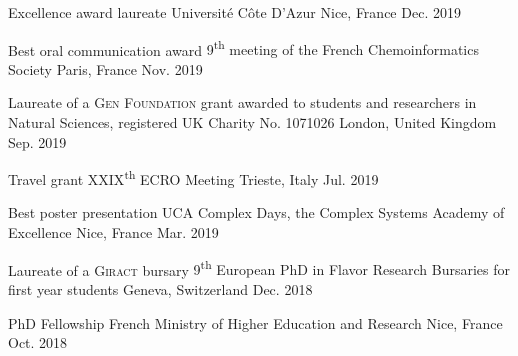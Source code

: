 
\begin{cvhonors}

  \cvhonor
  	{Excellence award laureate}
  	{Université Côte D'Azur}
  	{Nice, France}
  	{Dec. 2019}

  \cvhonor
  	{Best oral communication award}
  	{9\textsuperscript{th} meeting of the French Chemoinformatics Society}
  	{Paris, France}
  	{Nov. 2019}

  \cvhonor
  	{Laureate of a \textsc{Gen Foundation} grant}
  	{awarded to students and researchers in Natural Sciences, registered UK Charity No. 1071026}
  	{London, United Kingdom}
  	{Sep. 2019}

  \cvhonor
  	{Travel grant}
  	{\textsc{XXIX}\textsuperscript{th} \textsc{ECRO} Meeting}
  	{Trieste, Italy}
  	{Jul. 2019}

  \cvhonor
  	{Best poster presentation}
  	{UCA Complex Days, the Complex Systems Academy of Excellence}
  	{Nice, France}
  	{Mar. 2019}

  \cvhonor
  	{Laureate of a \textsc{Giract} bursary}
  	{9\textsuperscript{th} European PhD in Flavor Research Bursaries for first year students}
  	{Geneva, Switzerland}
  	{Dec. 2018}

  \cvhonor
  	{PhD Fellowship}
  	{French Ministry of Higher Education and Research}
  	{Nice, France}
  	{Oct. 2018}

\end{cvhonors}
